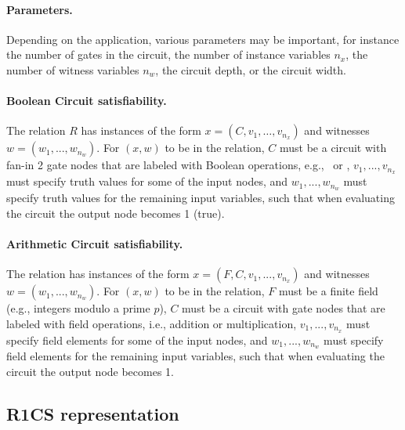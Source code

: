 \paragraph{Parameters.} 
Depending on the application, various parameters may be important, for instance the number of gates in the circuit, the number of instance variables $n_x$, the number of witness variables $n_w$, the circuit depth, or the circuit width.
 
\paragraph{Boolean Circuit satisfiability.} 
	The relation $R$ has instances of the form $x = (C, v_1, \ldots, v_{n_x})$ and witnesses $w = (w_1,...,w_{n_w})$. 
	For $(x,w)$ to be in the relation, $C$ must be a circuit with fan-in 2 gate nodes 
that are labeled with Boolean operations, e.g., \XOR\ or \AND, $v_1,...,v_{n_x}$ must specify 
truth values for some of the input nodes, and $w_1,...,w_{n_w}$ must specify 
truth values for the remaining input variables, such that when evaluating the circuit the output node becomes 1 (true).
 
\paragraph{Arithmetic Circuit satisfiability.} 
	The relation has instances of the form $x = (F, C, v_1,...,v_{n_x})$ and witnesses $w = (w_1,...,w_{n_w})$.
	For $(x,w)$ to be in the relation, $F$ must be a finite field (e.g., integers modulo a prime $p$), $C$ must be a circuit with gate nodes that are labeled with field operations, i.e., addition or multiplication, $v_1,...,v_{n_x}$ must specify field elements for some of the input nodes, and $w_1,...,w_{n_w}$ must specify field elements for the remaining input variables, such that when evaluating the circuit the output node becomes 1.
 


\subsection{R1CS representation}
\label{security:spec-statements-ZK:R1CS-representation}

\newcommand{\brkt}[1]{\ensuremath{\left\langle #1\right\rangle}}



